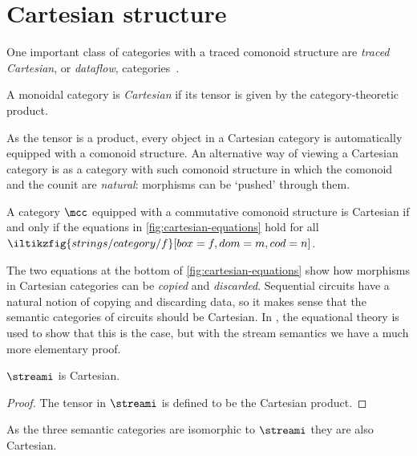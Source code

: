 \section{Cartesian structure}\label{sec:cartesian-structure}

One important class of categories with a traced comonoid structure are
\emph{traced Cartesian}, or \emph{dataflow},
categories~\cite{cazanescu1990new}.

\begin{definition}
    A monoidal category is \emph{Cartesian} if its tensor is given by the
    category-theoretic product.
\end{definition}

As the tensor is a product, every object in a Cartesian category is
automatically equipped with a comonoid structure.
An alternative way of viewing a Cartesian category is as a category with such
comonoid structure in which the comonoid and the counit are \emph{natural}:
morphisms can be `pushed' through them.

\begin{theorem}
    A category \(\mcc\) equipped with a commutative comonoid structure is
    Cartesian if and only if the equations in \cref{fig:cartesian-equations}
    hold for all \(\iltikzfig{strings/category/f}[box=f,dom=m,cod=n]\).
\end{theorem}



The two equations at the bottom of \cref{fig:cartesian-equations} show how
morphisms in Cartesian categories can be \emph{copied} and \emph{discarded}.
Sequential circuits have a natural notion of copying and discarding data, so it
makes sense that the semantic categories of circuits should be Cartesian.
In \cite{ghica2016categorical}, the equational theory is used to show that this
is the case, but with the stream semantics we have a much more elementary proof.

\begin{theorem}
    \(\streami\) is Cartesian.
\end{theorem}
\begin{proof}
    The tensor in \(\streami\) is defined to be the Cartesian product.
\end{proof}

As the three semantic categories are isomorphic to \(\streami\) they are also
Cartesian.

